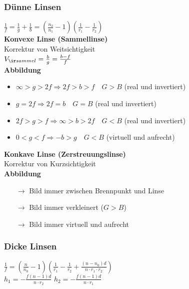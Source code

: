 \documentclass[german]{latex4ei/latex4ei_sheet}
\begin{document}
\begin{sectionbox}
\subsubsection{Dünne Linsen}
$\frac{1}{f}=\frac{1}{g}+\frac{1}{b}=(\frac{n_2}{n_1}-1)(\frac{1}{r_1}-\frac{1}{r_2})$\\
\textbf{Konvexe Linse (Sammellinse)} \\
Korrektur von Weitsichtigkeit \\
$V_{\ir sammel}= \frac{b}{g}=\frac{b-f}{f}$\\
\textbf{Abbildung}
\begin{itemize}
	\item $\infty > g > 2f \Rightarrow 2f>b>f \quad G>B$ (real und invertiert)
	\item $g=2f \Rightarrow 2f=b \quad G=B$ (real und invertiert)
	\item $2f>g>f \Rightarrow \infty >b>2f \quad G<B$ (real und invertiert)
	\item $0<g<f \Rightarrow -b>g \quad G<B$ (virtuell und aufrecht)
\end{itemize}
\textbf{Konkave Linse (Zerstreuungslinse)}\\
Korrektur von Kurzsichtigkeit\\
\textbf{Abbildung}
\begin{itemize}
\item[$\rightarrow$] Bild immer zwischen Brennpunkt und Linse
\item[$\rightarrow$] Bild immer verkleinert ($G>B$)
\item[$\rightarrow$] Bild immer virtuell und aufrecht
\end{itemize}
\end{sectionbox}
\begin{sectionbox}
\subsubsection{Dicke Linsen}
$\frac{1}{f}=(\frac{n}{n_0}-1)(\frac{1}{r_1}-\frac{1}{r_2}+\frac{(n-n_0)d}{n\cdot r_1 \cdot r_2})$\\
$h_1=-\frac{f(n-1)d}{n\cdot r_2}$ \qquad $h_2=-\frac{f(n-1)d}{n\cdot r_1}$
\end{sectionbox}
\end{document}
